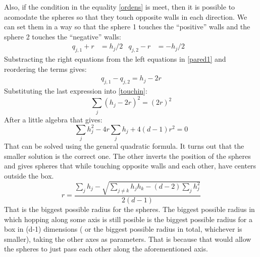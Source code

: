 \documentclass[superscriptaddress,pre,reprint,showpacs,onecolumn]{revtex4-1}
\begin{document}
Also, if the condition in the equality \ref{ordens} is meet, then
it is possible to acomodate the spheres so that they touch opposite walls in
each direction. We can set them in a way so that the sphere 1 touches the
``positive'' walls and the sphere 2 touches the ``negative'' walls:
\begin{align}\label{pared1}
  q_{j,1}+r & =h_j/2 & q_{j,2}-r & =-h_j/2 &
\end{align}
Substracting the right equations from the left equations in \ref{pared1}
and reordering the terms gives:
\begin{align}
  q_{j,1}-q_{j,2}=h_j-2r
\end{align}
Substituting the last expression into \ref{touchin}:
\begin{equation}
  \sum_j(h_j-2r)^2=(2r)^2
\end{equation}
After a little algebra that gives:
\begin{equation}
  \sum_j h_j^2 -4r\sum_j h_j + 4(d-1)r^2=0
\end{equation}
That can be solved using the general quadratic formula.
It turns out that the smaller solution is the correct one. The other
inverts the position of the spheres and gives spheres that while
touching opposite walls and each other, have centers outside the box.
\begin{equation}\label{rmax}
  r=\frac{\sum_j h_j - \sqrt{\sum_{j\neq k}h_j h_k-(d-2)\sum_j{h_j^2}}}{2(d-1)}
\end{equation}
That is the biggest possible radius for the spheres.
The biggest possible radius in which hopping along some axis is still
posible is the biggest possible radius for a box in (d-1) dimensions
( or the biggest possible radius in total, whichever is smaller),
taking the other axes as parameters. That is because that would allow
the spheres to just pass each other along the aforementioned axis.
\end{document}

